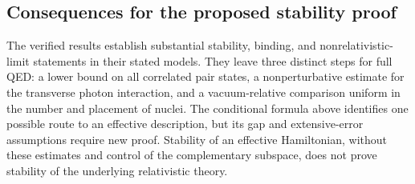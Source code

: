 \subsection{Consequences for the proposed stability proof}
\label{app-rel:consequences}

The verified results establish substantial stability, binding, and
nonrelativistic-limit statements in their stated models. They leave three
distinct steps for full QED: a lower bound on all correlated pair states,
a nonperturbative estimate for the transverse photon interaction, and a
vacuum-relative comparison uniform in the number and placement of nuclei.
The conditional formula above identifies one possible route to an
effective description, but its gap and extensive-error assumptions require
new proof. Stability of an effective Hamiltonian, without these estimates
and control of the complementary subspace, does not prove stability of
the underlying relativistic theory.
